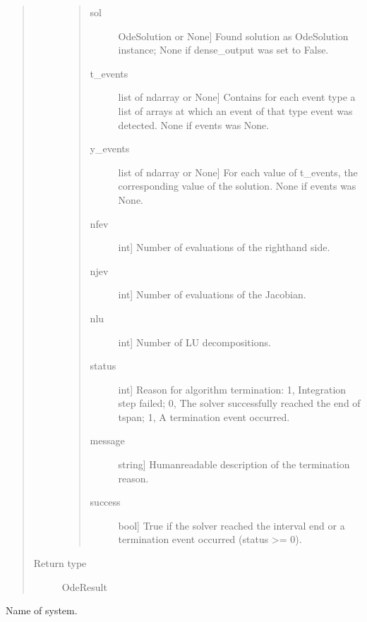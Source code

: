 \documentclass[a4paper,landscape,10pt,english]{sphinxmanual}
\begin{document}
\begin{fulllineitems}
\begin{fulllineitems}
\begin{quote}
\begin{description}
\begin{quote}
\begin{description}
\item[{sol}] \leavevmode{[}OdeSolution or None{]}
Found solution as OdeSolution instance; None if
dense\_output was set to False.

\item[{t\_events}] \leavevmode{[}list of ndarray or None{]}
Contains for each event type a list of arrays at which an
event of that type event was detected. None if events was
None.

\item[{y\_events}] \leavevmode{[}list of ndarray or None{]}
For each value of t\_events, the corresponding value of the
solution. None if events was None.

\item[{nfev}] \leavevmode{[}int{]}
Number of evaluations of the right\sphinxhyphen{}hand side.

\item[{njev}] \leavevmode{[}int{]}
Number of evaluations of the Jacobian.

\item[{nlu}] \leavevmode{[}int{]}
Number of LU decompositions.

\item[{status}] \leavevmode{[}int{]}
Reason for algorithm termination: \sphinxhyphen{}1, Integration step
failed; 0, The solver successfully reached the end of
tspan; 1, A termination event occurred.

\item[{message}] \leavevmode{[}string{]}
Human\sphinxhyphen{}readable description of the termination reason.

\item[{success}] \leavevmode{[}bool{]}
True if the solver reached the interval end or a
termination event occurred (status \textgreater{}= 0).

\end{description}
\end{quote}


\item[{Return type}] \leavevmode
OdeResult

\end{description}\end{quote}

\end{fulllineitems}


\begin{fulllineitems}
\label{\detokenize{code_docs/simulation_api.simulation:simulation_api.simulation.simulations.Simulation.system}}
Name of system.

\end{fulllineitems}


\end{fulllineitems}
\end{document}
